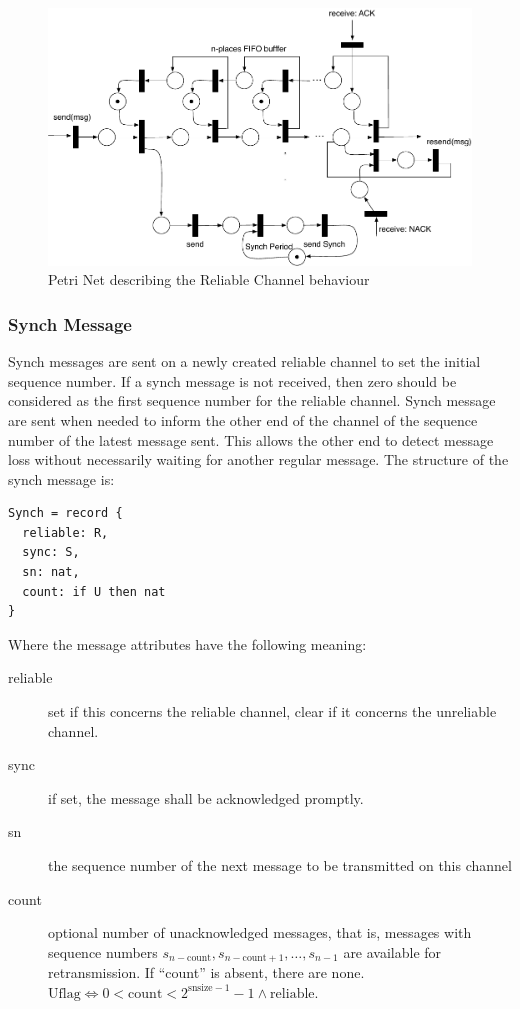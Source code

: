 \documentclass[a4paper,oneside,article]{memoir}
\begin{document}
\begin{figure}
\centering
\includegraphics[scale=0.6]{zenoh-relchan.pdf}
\caption{Petri Net describing the Reliable Channel behaviour}\label{fig:reliable-channel}
\end{figure}

\subsubsection{Synch Message}

Synch messages are sent on a newly created reliable channel to set the initial sequence number.  If
a synch message is not received, then zero should be considered as the first sequence number for the
reliable channel.  Synch message are sent when needed to inform the other end of the channel of the
sequence number of the latest message sent.  This allows the other end to detect message loss
without necessarily waiting for another regular message.  The structure of the synch message is:
\begin{verbatim}
Synch = record {
  reliable: R,
  sync: S,
  sn: nat,
  count: if U then nat
}
\end{verbatim}
Where the message attributes have the following meaning:
\begin{description}
\item[reliable] set if this concerns the reliable channel, clear if it concerns the unreliable
  channel.
\item[sync] if set, the message shall be acknowledged promptly.
\item[sn] the sequence number of the next message to be transmitted on this channel
\item[count] optional number of unacknowledged messages, that is, messages with sequence numbers
  $s_{n-\mathrm{count}}, s_{n-\mathrm{count}+1}, \ldots{}, s_{n-1}$ are available for
  retransmission.  If ``count'' is absent, there are none.
  $\mathrm{Uflag} \Leftrightarrow 0 < \mathrm{count} < 2^{\mathrm{snsize}-1}-1 \wedge
  \mathrm{reliable} $.
\end{description}
\end{document}

